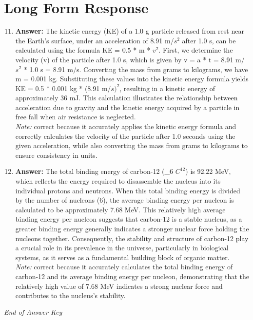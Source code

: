 \documentclass[12pt]{article}
\begin{document}
\section*{Long Form Response}
\begin{enumerate}[label=\arabic*.]
\setcounter{enumi}{10}
\item \textbf{Answer:} The kinetic energy (KE) of a 1.0 g particle released from rest near the Earth's surface, under an acceleration of 8.91 m/$s^2$ after 1.0 s, can be calculated using the formula KE = 0.5 * m * $v^2$. First, we determine the velocity (v) of the particle after 1.0 s, which is given by v = a * t = 8.91 m/$s^2$ * 1.0 s = 8.91 m/s. Converting the mass from grams to kilograms, we have m = 0.001 kg. Substituting these values into the kinetic energy formula yields KE = 0.5 * 0.001 kg * (8.91 m/$s)^2$, resulting in a kinetic energy of approximately 36 mJ. This calculation illustrates the relationship between acceleration due to gravity and the kinetic energy acquired by a particle in free fall when air resistance is neglected.
\\ \textit{Note:} correct because it accurately applies the kinetic energy formula and correctly calculates the velocity of the particle after 1.0 seconds using the given acceleration, while also converting the mass from grams to kilograms to ensure consistency in units.
\item \textbf{Answer:} The total binding energy of carbon-12 (\_6 $C^12$) is 92.22 MeV, which reflects the energy required to disassemble the nucleus into its individual protons and neutrons. When this total binding energy is divided by the number of nucleons (6), the average binding energy per nucleon is calculated to be approximately 7.68 MeV. This relatively high average binding energy per nucleon suggests that carbon-12 is a stable nucleus, as a greater binding energy generally indicates a stronger nuclear force holding the nucleons together. Consequently, the stability and structure of carbon-12 play a crucial role in its prevalence in the universe, particularly in biological systems, as it serves as a fundamental building block of organic matter.
\\ \textit{Note:} correct because it accurately calculates the total binding energy of carbon-12 and its average binding energy per nucleon, demonstrating that the relatively high value of 7.68 MeV indicates a strong nuclear force and contributes to the nucleus's stability.
\end{enumerate}

\vfill
\noindent\textit{End of Answer Key}
\end{document}
